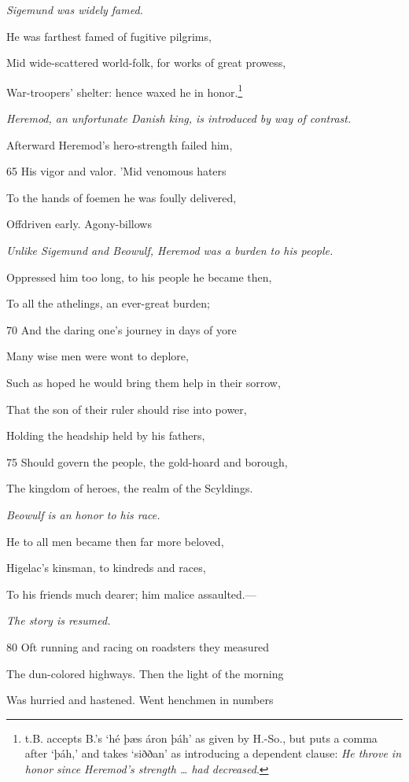 \emph{Sigemund was
widely famed.}

He was farthest famed of fugitive pilgrims,

Mid wide-scattered world-folk, for works of great prowess,

War-troopers’ shelter: hence waxed he in honor.\footnote{t.B. accepts B.’s ‘hé þæs áron þáh’ as given by H.-So., but puts a comma
after ‘þáh,’ and takes ‘siððan’ as introducing a dependent clause: \emph{He throve
in honor since Heremod’s strength … had decreased}.}

\emph{Heremod, an unfortunate
Danish
king, is introduced
by way of contrast.}

Afterward Heremod’s hero-strength failed him,

65
His vigor and valor. ’Mid venomous haters

To the hands of foemen he was foully delivered,

Offdriven early. Agony-billows

\emph{Unlike Sigemund
and Beowulf, Heremod
was a burden
to his people.}

Oppressed him too long, to his people he became then,

To all the athelings, an ever-great burden;

70
And the daring one’s journey in days of yore

Many wise men were wont to deplore,

Such as hoped he would bring them help in their sorrow,

That the son of their ruler should rise into power,

Holding the headship held by his fathers,

75
Should govern the people, the gold-hoard and borough,

The kingdom of heroes, the realm of the Scyldings.

\emph{Beowulf is an
honor to his race.}

He to all men became then far more beloved,

Higelac’s kinsman, to kindreds and races,

To his friends much dearer; him malice assaulted.—

\emph{The story is resumed.}

80
Oft running and racing on roadsters they measured

The dun-colored highways. Then the light of the morning

Was hurried and hastened. Went henchmen in numbers

